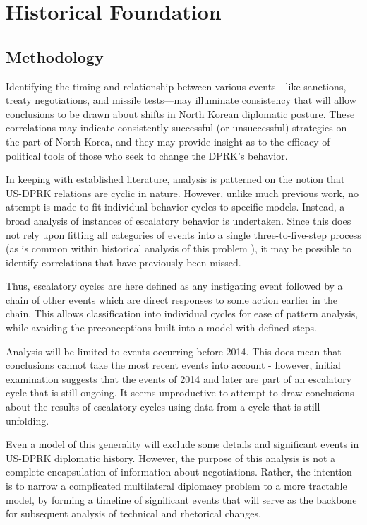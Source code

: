 \chapter{Historical Foundation}
\section{Methodology}

Identifying the timing and relationship between various events---like sanctions, treaty negotiations, and missile tests---may illuminate consistency that will allow conclusions to be drawn about shifts in North Korean diplomatic posture. These correlations may indicate consistently successful (or unsuccessful) strategies on the part of North Korea, and they may provide insight as to the efficacy of political tools of those who seek to change the DPRK's behavior.

In keeping with established literature, analysis is patterned on the notion that US-DPRK relations are cyclic in nature. However, unlike much previous work, no attempt is made to fit individual behavior cycles to specific models. Instead, a broad analysis of instances of escalatory behavior is undertaken. Since this does not rely upon fitting all categories of events into a single three-to-five-step process (as is common within historical analysis of this problem \cite{fisher, jun}), it may be possible to identify correlations that have previously been missed.

Thus, escalatory cycles are here defined as any instigating event followed by a chain of other events which are direct responses to some action earlier in the chain. This allows classification into individual cycles for ease of pattern analysis, while avoiding the preconceptions built into a model with defined steps.

Analysis will be limited to events occurring before 2014. This does mean that conclusions cannot take the most recent events into account - however, initial examination suggests that the events of 2014 and later are part of an escalatory cycle that is still ongoing. It seems unproductive to attempt to draw conclusions about the results of escalatory cycles using data from a cycle that is still unfolding.

Even a model of this generality will exclude some details and significant events in US-DPRK diplomatic history. However, the purpose of this analysis is not a complete encapsulation of information about negotiations. Rather, the intention is to narrow a complicated multilateral diplomacy problem to a more tractable model, by forming a timeline of significant events that will serve as the backbone for subsequent analysis of technical and rhetorical changes.

